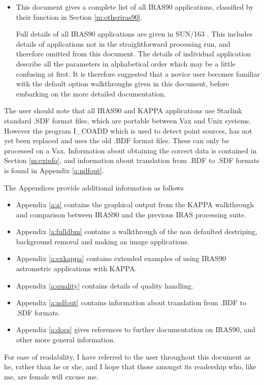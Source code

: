 \begin{itemize}
\item This document gives a complete list of all IRAS90 applications, classified
by their function in Section \ref{m:otheriras90}. 

Full details of all IRAS90 applications are given in SUN/163 . This includes
details of applications not in the straightforward processing run, and
therefore omitted from this document. The details of individual application
describe all the parameters in alphabetical order which may be a little
confusing at first. It is therefore suggested that a novice user becomes
familiar with the default option walkthroughs given in this document, before
embarking on the more detailed documentation.
\end{itemize}

The user should note that all IRAS90 and KAPPA applications use Starlink
standard .SDF format files, which are portable between Vax and Unix systems.
However the program I\_COADD which is used to detect point sources, has not
yet been replaced and uses the old .BDF format files. These can only be
processed on a Vax. Information about obtaining the correct data is contained
in Section \ref{m:exinfo}, and information about translation from .BDF to .SDF
formats is found in Appendix \ref{a:ndfout}.

The Appendices provide additional information as follows
\begin{itemize}
\item Appendix \ref{a:a} contains the graphical output from the KAPPA
walkthrough and comparison between IRAS90 and the previous IRAS processing
suite.
\item Appendix \ref{a:fulldbm} contains a walkthrough of the non defaulted
destriping, background removal and making an image applications.
\item Appendix \ref{a:exkappa} contains extended examples of using IRAS90
astrometric applications with KAPPA.
\item Appendix \ref{a:quality} contains details of quality handling.
\item Appendix \ref{a:ndfout} contains information about translation from
.BDF to .SDF formats.
\item Appendix \ref{a:docs} gives references to further documentation on IRAS90,
and other more general information.
\end{itemize}

For ease of readability, I have referred to the user throughout this document  
as he, rather than he or she, and I hope that those amongst its readership 
who, like me, are female will excuse me.

